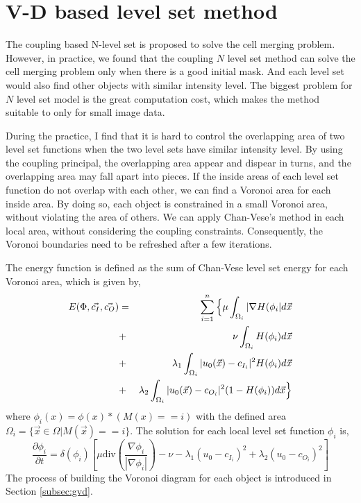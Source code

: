 \section{V-D based level set method} \label{sec:vdlst}
The coupling based N-level set is proposed to solve the cell merging problem. However, in practice, we found that the coupling $N$ level set method can solve the cell merging problem only when there is a good initial mask. And each level set would also find other objects with similar intensity level. The biggest problem for $N$ level set model is the great computation cost, which makes the method suitable to only for small image data.

During the practice, I find that it is hard to control the overlapping area of two level set functions when the two level sets have similar intensity level. By using the coupling principal, the overlapping area appear and dispear in turns, and the overlapping area may fall apart into pieces. If the inside areas of each level set function do not overlap with each other, we can find a Voronoi area for each inside area. By doing so, each object is constrained in a small Voronoi area, without violating the area of others. We can apply Chan-Vese's method in each local area, without considering the coupling constraints. Consequently, the Voronoi boundaries need to be refreshed after a few iterations.

The energy function is defined as the sum of Chan-Vese level set energy for each Voronoi area, which is given by,
\begin{eqnarray}
\nonumber
E(\Phi,\vec{c_I},\vec{c_O}) & = & \sum_{i=1}^n \Big{\{}\mu \int_{\Omega_i} |\nabla H(\phi_i|d\vec{x} \\
\nonumber
                                                                    & + & \nu\int_{\Omega_i} H(\phi_i)d\vec{x}\\
                                                                    & + & \lambda_1 \int _{\Omega_i}|u_0(\vec{x}) - c_{I_i}|^2H(\phi_i)d\vec{x} \\
\nonumber
                                                                    & + & \lambda_2\int_{\Omega_i}|u_0(\vec{x}) - c_{O_i}|^2(1-H(\phi_i))d\vec{x} \Big{\}}
\end{eqnarray}
where $\phi_i(x) = \phi(x) * (M(x) == i)$ with the defined area $\Omega_i = \{\vec{x} \in \Omega | M(\vec{x}) == i\}$. The solution for each local level set function $\phi_i$ is,
\begin{equation}
\frac{\partial \phi_i}{\partial t} = \delta(\phi_i)\left[\mu\mbox{div}\left(\frac{\nabla\phi_i}{|\nabla\phi_i|}\right)-\nu -\lambda_1(u_0-c_{I_i})^2 + \lambda_2(u_0-c_{O_i})^2\right]
\end{equation}
The process of building the Voronoi diagram for each object is introduced in Section \ref{subsec:gvd}.


